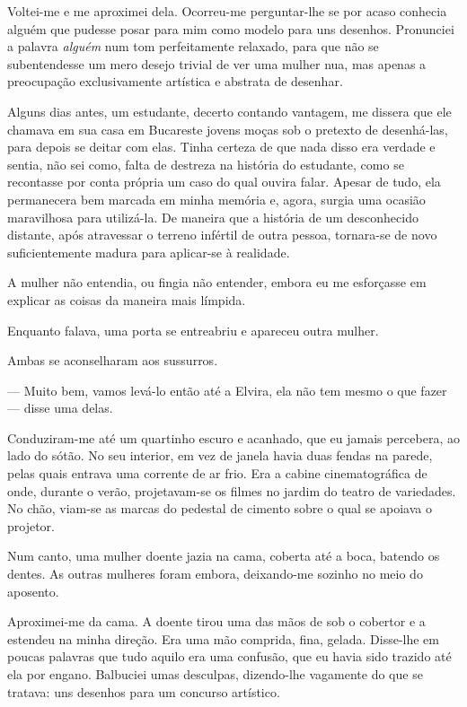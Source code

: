 Voltei-me e me aproximei dela. Ocorreu-me perguntar-lhe se por acaso conhecia alguém que pudesse posar para mim como modelo para uns desenhos. Pronunciei a palavra \textit{alguém} num tom perfeitamente relaxado, para que não se subentendesse um mero desejo trivial de ver uma mulher nua, mas apenas a preocupação exclusivamente artística e abstrata de desenhar.

Alguns dias antes, um estudante, decerto contando vantagem, me dissera que ele chamava em sua casa em Bucareste jovens moças sob o pretexto de desenhá-las, para depois se deitar com elas. Tinha certeza de que nada disso era verdade e sentia, não sei como, falta de destreza na história do estudante, como se recontasse por conta própria um caso do qual ouvira falar. Apesar de tudo, ela permanecera bem marcada em minha memória e, agora, surgia uma ocasião maravilhosa para utilizá-la. De maneira que a história de um desconhecido distante, após atravessar o terreno infértil de outra pessoa, tornara-se de novo suficientemente madura para aplicar-se à realidade.

A mulher não entendia, ou fingia não entender, embora eu me esforçasse em explicar as coisas da maneira mais límpida.

Enquanto falava, uma porta se entreabriu e apareceu outra mulher.

Ambas se aconselharam aos sussurros.

--- Muito bem, vamos levá-lo então até a Elvira, ela não tem mesmo o que fazer --- disse uma delas.

Conduziram-me até um quartinho escuro e acanhado, que eu jamais percebera, ao lado do sótão. No seu interior, em vez de janela havia duas fendas na parede, pelas quais entrava uma corrente de ar frio. Era a cabine cinematográfica de onde, durante o verão, projetavam-se os filmes no jardim do teatro de variedades. No chão, viam-se as marcas do pedestal de cimento sobre o qual se apoiava o projetor.

Num canto, uma mulher doente jazia na cama, coberta até a boca, batendo os dentes. As outras mulheres foram embora, deixando-me sozinho no meio do aposento.

Aproximei-me da cama. A doente tirou uma das mãos de sob o cobertor e a estendeu na minha direção. Era uma mão comprida, fina, gelada. Disse-lhe em poucas palavras que tudo aquilo era uma confusão, que eu havia sido trazido até ela por engano. Balbuciei umas desculpas, dizendo-lhe vagamente do que se tratava: uns desenhos para um concurso artístico.


